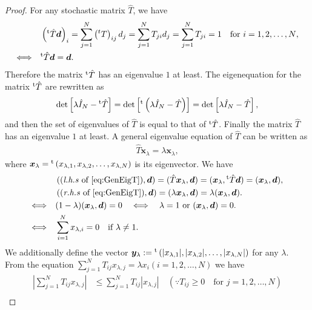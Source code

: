 \begin{proof}
	For any stochastic matrix $\hat{T}$, we have
	\begin{align}
	&\left({}^{\rm t}\hat{T}\bm{d}\right)_{i}=\sum_{j=1}^{N}\left({}^{t}T\right)_{ij}d_{j}=\sum_{j=1}^{N}T_{ji}d_{j}=\sum_{j=1}^{N}T_{ji}=1\quad\text{for $i=1,2,\dots,N$},\\
	\Longleftrightarrow\quad &{}^{\rm t}\hat{T}\bm{d} = \bm{d}.
	\end{align}
	Therefore the matrix ${}^{\rm t}\hat{T}$ has an eigenvalue $1$ at least. The eigenequation for the matrix ${}^{\rm t}\hat{T}$ are rewritten as
	\begin{align}
	\det\left[\lambda \hat{I}_{N} - {}^{\rm t}\hat{T}\right] = \det\left[{}^{\rm t}\left(\lambda \hat{I}_{N} - \hat{T}\right)\right] = \det\left[\lambda \hat{I}_{N} - \hat{T}\right],
	\end{align}
	and then the set of eigenvalues of $\hat{T}$ is equal to that of ${}^{\rm t}\hat{T}$. Finally the matrix $\hat{T}$ has an eigenvalue $1$ at least. A general eigenvalue equation of $\hat{T}$ can be written as
	\begin{align}
	\hat{T}\bm{x}_{\lambda} = \lambda\bm{x}_{\lambda}\label{eq:GenEigT},
	\end{align}
	where $\bm{x}_{\lambda}={}^{\rm t}\left(x_{\lambda,1},x_{\lambda,2},\dots,x_{\lambda,N}\right)$ is its eigenvector. We have
	\begin{align}
	&\left((\text{\textit{l.h.s} of \ref{eq:GenEigT}}),\bm{d}\right) = (\hat{T}\bm{x}_{\lambda},\bm{d}) = (\bm{x}_{\lambda},{}^{\rm t}\hat{T}\bm{d}) = (\bm{x}_{\lambda},\bm{d}),\\
	&\left((\text{\textit{r.h.s} of \ref{eq:GenEigT}}),\bm{d}\right) = (\lambda\bm{x}_{\lambda},\bm{d}) = \lambda(\bm{x}_{\lambda},\bm{d}).\\
	\Longleftrightarrow \quad& (1-\lambda)(\bm{x}_{\lambda},\bm{d}) = 0\quad\Longleftrightarrow \quad \lambda = 1\text{ or }(\bm{x}_{\lambda},\bm{d}) = 0.\\
	\Longleftrightarrow \quad& \sum_{i=1}^{N}x_{\lambda,i} = 0\quad\text{if $\lambda \neq 1$}.
	\end{align}
	We additionally define the vector $\bm{y}_{\lambda}:={}^{\rm t}\left(|x_{\lambda,1}|,|x_{\lambda,2}|,\dots,|x_{\lambda,N}|\right)$ for any $\lambda$. From the equation $\sum_{j=1}^{N}T_{ij}x_{\lambda,j}=\lambda x_{i}(i=1,2,\dots,N)$ we have
	\begin{align}
	|\sum_{j=1}^{N}T_{ij}x_{\lambda,j}| &\leq \sum_{j=1}^{N}T_{ij}|x_{\lambda,j}|\quad(\because T_{ij}\geq 0\quad\text{for $j=1,2,\dots,N$})\\

\end{align}
\end{proof}
